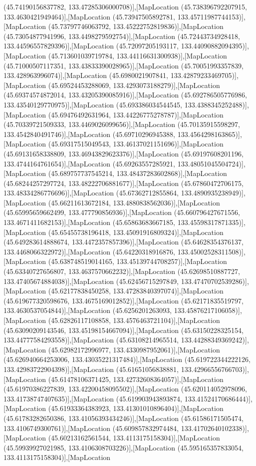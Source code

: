 (45.74190156837782, 133.47285306000708)],[MapLocation (45.738396792207915, 133.4630421949464)],[MapLocation (45.73947505892781, 133.45711987744153)],[MapLocation (45.73797746063792, 133.45222752819836)],[MapLocation (45.73054877941996, 133.4498279592754)],[MapLocation (45.72443734928418, 133.44596557829396)],[MapLocation (45.72097205193117, 133.44090882094395)],[MapLocation (45.713601039719784, 133.44116631300938)],[MapLocation (45.71000507117351, 133.43833390028965)],[MapLocation (45.70051993357839, 133.428963996074)],[MapLocation (45.6980021907841, 133.42879233469705)],[MapLocation (45.69524453288069, 133.4293073188279)],[MapLocation (45.69374574872014, 133.43205390085916)],[MapLocation (45.692786505776986, 133.43540129770975)],[MapLocation (45.693386034544545, 133.4388345252488)],[MapLocation (45.69476492631964, 133.44226775278787)],[MapLocation (45.70339721509333, 133.4469026099656)],[MapLocation (45.70135915598297, 133.4542840491746)],[MapLocation (45.69710296945388, 133.4564298163865)],[MapLocation (45.69317515049543, 133.46137021151696)],[MapLocation (45.69131658338809, 133.46943829623376)],[MapLocation (45.69197608201196, 133.4744164761654)],[MapLocation (45.69263557285921, 133.48051045504724)],[MapLocation (45.689757737545214, 133.48437283602868)],[MapLocation (45.68244257297724, 133.48222706881677)],[MapLocation (45.67860472706175, 133.48334286776696)],[MapLocation (45.67362712855864, 133.4890935238949)],[MapLocation (45.66211613672184, 133.4880838562036)],[MapLocation (45.65995659662499, 133.477790856936)],[MapLocation (45.660796427671556, 133.4671411682153)],[MapLocation (45.65863683667185, 133.45598317871335)],[MapLocation (45.65455738196418, 133.45091916809324)],[MapLocation (45.649283614888674, 133.4472357857396)],[MapLocation (45.64628354376137, 133.4468066322972)],[MapLocation (45.64220318916876, 133.45002528311508)],[MapLocation (45.638748519014165, 133.45139744708257)],[MapLocation (45.63340727656807, 133.4637570662232)],[MapLocation (45.62698510887727, 133.47405674884038)],[MapLocation (45.62456715297849, 133.47470702539286)],[MapLocation (45.62177838450258, 133.47283840397074)],[MapLocation (45.619677320598676, 133.4675169012852)],[MapLocation (45.62171835519797, 133.4630537054844)],[MapLocation (45.6256201263093, 133.45876217106058)],[MapLocation (45.62826117108858, 133.4576463721104)],[MapLocation (45.63090209143546, 133.45198154667094)],[MapLocation (45.63150228325154, 133.44777584293558)],[MapLocation (45.63108214965514, 133.44288349369242)],[MapLocation (45.62982172996977, 133.4330987952061)],[MapLocation (45.626940664253006, 133.43035221317484)],[MapLocation (45.619722344222126, 133.42983722904398)],[MapLocation (45.61651056838881, 133.42966556766703)],[MapLocation (45.61478106371425, 133.42732608364057)],[MapLocation (45.61970386227839, 133.42200458095502)],[MapLocation (45.620114052978096, 133.41738747407635)],[MapLocation (45.619903943893874, 133.41524170686444)],[MapLocation (45.61933364383923, 133.41301010896404)],[MapLocation (45.61783282650386, 133.41056393434246)],[MapLocation (45.61586171505474, 133.4106749300761)],[MapLocation (45.609857832974484, 133.41702640102338)],[MapLocation (45.60213162561544, 133.4113175158304)],[MapLocation (45.59939927021985, 133.4106308703226)],[MapLocation (45.595165357833054, 133.4113175158304)],[MapLocation 